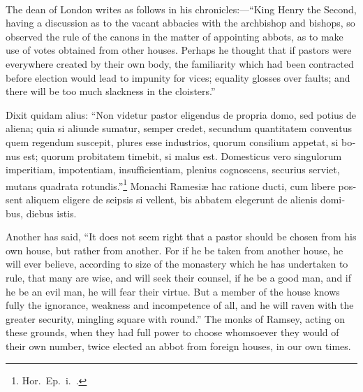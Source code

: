 \documentclass[10pt]{book}
\newcounter{engnote}
\newcommand{\engnotenum}{\textsuperscript{\arabic{engnote}\stepcounter{engnote}}}
\begin{document}
\begin{paracol}{2}
\begin{otherlanguage}{latin}
\end{otherlanguage}

\switchcolumn

The dean of London\engnotenum{} writes as follows in his chronicles:---``King Henry the Second, having a discussion as to the vacant abbacies with the archbishop and bishops, so observed the rule of the canons in the matter of appointing abbots, as to make use of votes obtained from other houses. Perhaps he thought that if pastors were everywhere created by their own body, the familiarity which had been contracted before election would lead to impunity for vices; equality glosses over faults; and there will be too much slackness in the cloisters.''

\switchcolumn*

\begin{otherlanguage}{latin}
Dixit quidam alius: ``Non videtur pastor eligendus de propria domo, sed potius de aliena; quia si aliunde sumatur, semper credet, secundum quantitatem conventus quem regendum suscepit, plures esse industrios, quorum consilium appetat, si bonus est; quorum probitatem timebit, si malus est. Domesticus vero singulorum imperitiam, impotentiam, insufficientiam, plenius cognoscens, securius serviet, mutans quadrata rotundis.''\footnote[\textdagger]{Hor.\ Ep.\ i.\ .} Monachi Ramesi\ae{} hac ratione ducti, cum libere possent aliquem eligere de seipsis si vellent, bis abbatem elegerunt de alienis domibus, diebus istis.
\end{otherlanguage}

\switchcolumn

Another has said, ``It does not seem right that a pastor should be chosen from his own house, but rather from another. For if he be taken from another house, he will ever believe, according to size of the monastery which he has undertaken to rule, that many are wise, and will seek their counsel, if he be a good man, and if he be an evil man, he will fear their virtue. But a member of the house knows fully the ignorance, weakness and incompetence of all, and he will raven with the greater security, mingling square with round.'' The monks of Ramsey, acting on these grounds, when they had full power to choose whomsoever they would of their own number, twice elected an abbot from foreign houses, in our own times.

\switchcolumn*


\end{paracol}
\end{document}
